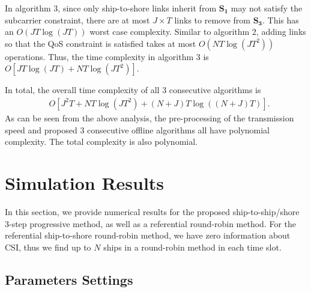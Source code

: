 \documentclass[conference]{IEEEtran}
\begin{document}
 In algorithm 3, since only ship-to-shore links inherit from ${{\mathbf{S}}_{\mathbf{1}}}$ may not satisfy the subcarrier constraint, there are at most $J \times T$ links to remove from ${{\mathbf{S}}_{\mathbf{3}}}$. This has an $O\left( JT\log \left( JT \right) \right)$ worst case complexity. Similar to algorithm 2, adding links so that the QoS constraint is satisfied takes at most $O\left( NT\log \left( JT^2 \right) \right)$ operations. Thus, the time complexity in algorithm 3 is $O\left[ JT \log \left( JT \right) + NT \log \left( {JT^2} \right) \right]$.

 In total, the overall time complexity of all 3 consecutive algorithms is 
 \begin{align}
  &  O\left[  J^2 T  + { N T \log \left( JT^2 \right) + \left( {N + J} \right)T \log \left( {\left( {N + J} \right)T} \right)} \right].
 \end{align}
 As can be seen from the above analysis, the pre-processing of the transmission speed and proposed 3 consecutive offline algorithms all have polynomial complexity. The total complexity is also polynomial. 
 
 \section{Simulation Results}\label{sec:4}
 
 In this section, we provide numerical results for the proposed ship-to-ship/shore 3-step progressive method, as well as a referential round-robin method. 
 For the referential ship-to-shore round-robin method, we have zero information about CSI, thus we find up to $N$ ships in a round-robin method in each time slot. 
 
 \subsection{Parameters Settings}
 
 
 
\end{document}
